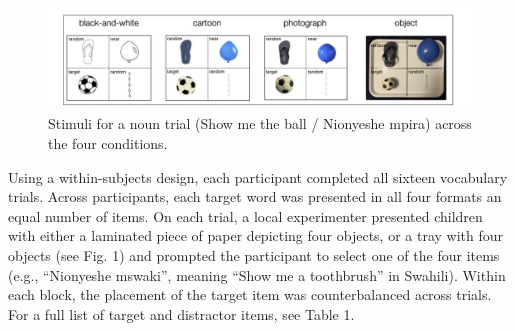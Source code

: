 \documentclass[10pt, letterpaper]{article}
\begin{document}
\begin{CodeChunk}
\begin{figure}[tb]

{\centering \includegraphics[width=6in]{fig1_labeled} 

}

\caption[Stimuli for a noun trial (Show me the ball / Nionyeshe mpira) across the four conditions]{Stimuli for a noun trial (Show me the ball / Nionyeshe mpira) across the four conditions.}\label{fig:figure1}
\end{figure}
\end{CodeChunk}

Using a within-subjects design, each participant completed all sixteen
vocabulary trials. Across participants, each target word was presented
in all four formats an equal number of items. On each trial, a local
experimenter presented children with either a laminated piece of paper
depicting four objects, or a tray with four objects (see Fig. 1) and
prompted the participant to select one of the four items (e.g.,
``Nionyeshe mswaki'', meaning ``Show me a toothbrush'' in Swahili).
Within each block, the placement of the target item was counterbalanced
across trials. For a full list of target and distractor items, see Table
1.
\end{document}
